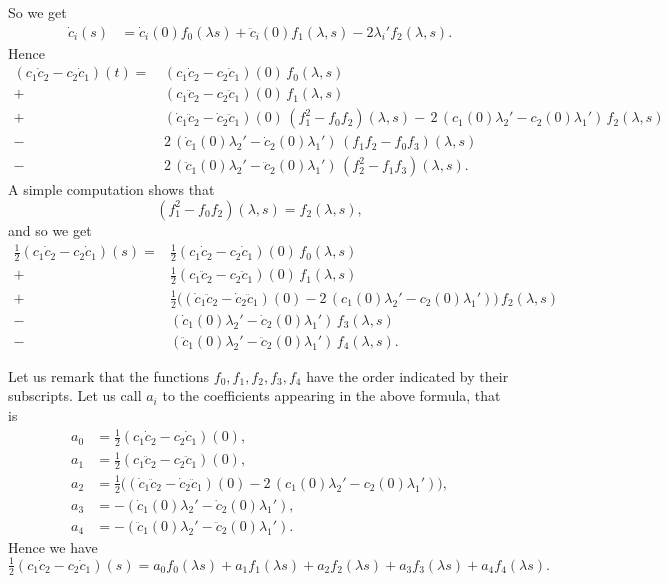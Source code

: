 \documentclass[10pt]{amsart}
\theoremstyle{definition}
\theoremstyle{remark}
\numberwithin{equation}{section}
\begin{document}
So we get
\begin{align*}
\dot{c}_i(s)&=\dot{c}_i(0)f_0({\lambda} s)+\ddot{c}_i(0)f_1({\lambda}, s)-2{\lambda}_i'f_2({\lambda}, s).
\end{align*}
Hence
\begin{align*}
(c_{1}\dot{c}_{2}-c_{2}\dot{c}_{1})(t)=&\,(c_{1}\dot{c}_{2}-c_{2}\dot{c}_{1})(0)\,f_{0}({\lambda}, s)
\\
+&\,(c_{1}\ddot{c}_{2}-c_{2}\ddot{c}_{1})(0)\,f_{1}({\lambda}, s)
\\
+&\,(\dot{c}_{1}\ddot{c}_{2}-\dot{c}_{2}\ddot{c}_{1})(0)\,(f_{1}^2-f_{0}f_{2})({\lambda}, s)
-\,2\,(c_{1}(0){\lambda}_2'-c_{2}(0){\lambda}_1')\,f_{2}({\lambda}, s)
\\
-&\,2\,(\dot{c}_{1}(0){\lambda}_2'-\dot{c}_{2}(0){\lambda}_1')\,(f_{1}f_{2}-f_{0}f_{3})({\lambda}, s)
\\
-&\,2\,(\ddot{c}_{1}(0){\lambda}_2'-\ddot{c}_{2}(0){\lambda}_1')\,(f_{2}^2-f_{1}f_{3})({\lambda}, s).
\end{align*}
A simple computation shows that
\begin{equation*}
(f_{1}^2-f_{0}f_{2})({\lambda}, s)=f_{2}({\lambda},s),
\end{equation*}
and so we get
\begin{align*}
\tfrac{1}{2}(c_{1}\dot{c}_{2}-c_{2}\dot{c}_{1})(s)=&\tfrac{1}{2}(c_{1}\dot{c}_{2}-c_{2}\dot{c}_{1})(0)\,f_{0}({\lambda},s)
\\
+&\tfrac{1}{2}(c_{1}\ddot{c}_{2}-c_{2}\ddot{c}_{1})(0)\,f_{1}({\lambda}, s)
\\
+&\tfrac{1}{2}\big((\dot{c}_{1}\ddot{c}_{2}-\dot{c}_{2}\ddot{c}_{1})(0)-2\,(c_{1}(0){\lambda}_{2}'-c_{2}(0){\lambda}_{1}')\big)\,f_{2}({\lambda},s)
\\
-&(\dot{c}_{1}(0){\lambda}_{2}'-\dot{c}_{2}(0){\lambda}_{1}')\,f_3({\lambda}, s)
\\
-&(\ddot{c}_{1}(0){\lambda}_{2}'-\ddot{c}_{2}(0){\lambda}_{1}')\,f_4({\lambda}, s).
\end{align*}

Let us remark that the functions $f_0,f_1,f_2,f_3,f_4$ have the order indicated by their subscripts. Let us call $a_{i}$ to the coefficients appearing in the above formula, that is
\begin{equation*}
\begin{split}
a_0&=\tfrac{1}{2}(c_{1}\dot{c}_{2}-c_{2}\dot{c}_{1})(0),
\\
a_1&=\tfrac{1}{2}(c_{1}\ddot{c}_{2}-c_{2}\ddot{c}_{1})(0),
\\
a_2&=\tfrac{1}{2}\big((\dot{c}_{1}\ddot{c}_{2}-\dot{c}_{2}\ddot{c}_{1})(0)-2\,(c_{1}(0){\lambda}_{2}'-c_{2}(0){\lambda}_{1}')\big),
\\
a_3&=-(\dot{c}_{1}(0){\lambda}_{2}'-\dot{c}_{2}(0){\lambda}_{1}'),
\\
a_4&=-(\ddot{c}_{1}(0){\lambda}_{2}'-\ddot{c}_{2}(0){\lambda}_{1}').
\end{split}
\end{equation*}
Hence we have
\begin{equation*}
\tfrac{1}{2}(c_{1}\dot{c}_{2}-c_{2}\dot{c}_{1})(s)=a_{0}f_{0}({\lambda} s)+a_{1}f_{1}({\lambda} s)+a_{2}f_{2}({\lambda} s)+a_{3}f_3({\lambda} s)+a_{4}f_4({\lambda} s).
\end{equation*}
\end{document}
